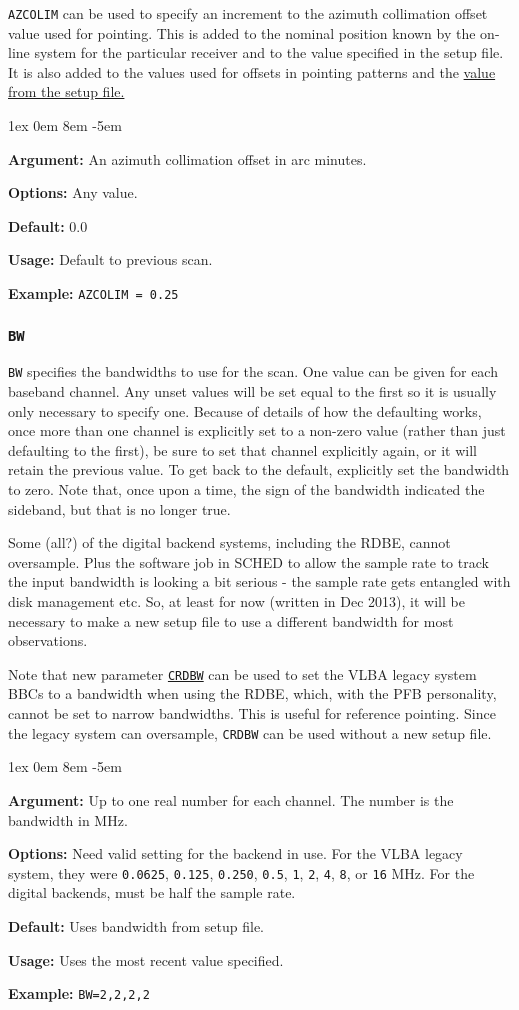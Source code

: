 \documentclass{report}
\newcommand{\rcwbox}[5]{
  \begin{list}{}{\parsep 1ex  \itemsep 0em
                 \leftmargin 8em  \itemindent -5em }
    \item {\bf Argument:} #1
    \item {\bf Options:}  #2
    \item {\bf Default:}  #3
    \item {\bf Usage:}    #4
    \item {\bf Example:}  #5
  \end{list}
}
\begin{document}
{\tt AZCOLIM} can be used to specify an
increment to the azimuth collimation offset value used for pointing.
This is added to the nominal position known by the on-line system
for the particular receiver and to the value specified in the setup
file.  It is also added to the values used for offsets in pointing
patterns and the 
{\hyperref[SP:AZCOLIM]{value from the setup file.}}

\rcwbox
{An azimuth collimation offset in arc minutes.}
{Any value.}
{0.0}
{Default to previous scan.}
{{\tt AZCOLIM = 0.25 }}



\subsubsection{\label{MP:BW}{\tt BW}}

{\tt BW} specifies the bandwidths to use for the scan.  One value can
be given for each baseband channel.  Any unset values will be set
equal to the first so it is usually only necessary to specify one.
Because of details of how the defaulting works, once more than one
channel is explicitly set to a non-zero value (rather than just
defaulting to the first), be sure to set that channel explicitly
again, or it will retain the previous value.  To get back to the 
default, explicitly set the bandwidth to zero.  Note that, once upon
a time, the sign of the bandwidth indicated the sideband, but that
is no longer true.

Some (all?) of the digital backend systems, including the RDBE, cannot
oversample.  Plus the software job in SCHED to allow the sample rate
to track the input bandwidth is looking a bit serious - the sample rate
gets entangled with disk management etc.  So, at least for now (written
in Dec 2013), it will be necessary to make a new setup file to use
a different bandwidth for most observations.

Note that new parameter 
{\hyperref[MP:CRDBW]{{\tt CRDBW}}} can be used to
set the VLBA legacy system BBCs to a bandwidth when using the RDBE,
which, with the PFB personality, cannot be set to narrow bandwidths.
This is useful for reference pointing.  Since the legacy system can
oversample, {\tt CRDBW} can be used without a new setup file.

\rcwbox
{Up to one real number for each channel.  The number is the bandwidth
in MHz.}
{Need valid setting for the backend in use.  For the VLBA legacy
system, they were {\tt 0.0625}, {\tt 0.125}, {\tt 0.250}, {\tt 0.5},
{\tt 1}, {\tt 2}, {\tt 4}, {\tt 8}, or {\tt 16} MHz. For the digital
backends, must be half the sample rate.}
{Uses bandwidth from setup file.}
{Uses the most recent value specified.}
{{\tt BW=2,2,2,2}}
\end{document}
